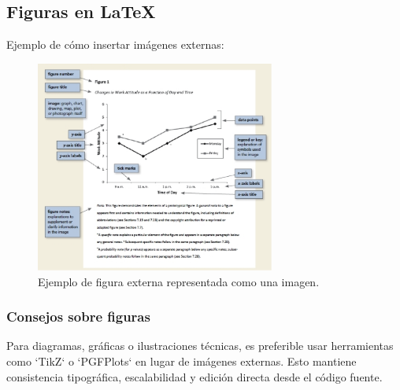   
  \subsection{Figuras en \LaTeX}
  
  Ejemplo de cómo insertar imágenes externas:
  
  \begin{figure}[H]
      \centering
      \includegraphics[width=0.7\textwidth]{images/figura.png}
      \caption{Ejemplo de figura externa representada como una imagen.}
      \label{fig:ejemplo_figura}
  \end{figure}
  
  \subsubsection{Consejos sobre figuras}
  Para diagramas, gráficas o ilustraciones técnicas, es preferible usar herramientas como `TikZ` o `PGFPlots` en lugar de imágenes externas.  
  Esto mantiene consistencia tipográfica, escalabilidad y edición directa desde el código fuente.
  
 
\clearpage 